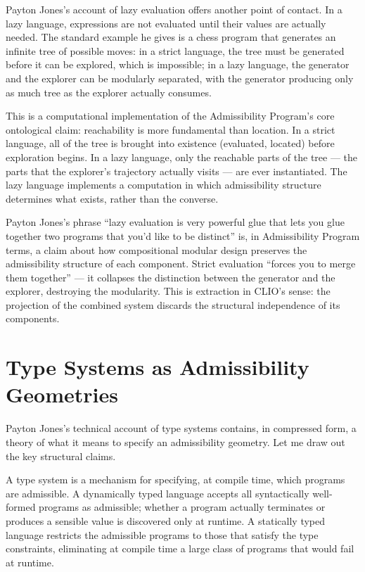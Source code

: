 \documentclass[12pt]{article}
\begin{document}
Payton Jones's account of lazy evaluation offers another point of contact. In a
lazy language, expressions are not evaluated until their values are actually
needed. The standard example he gives is a chess program that generates an
infinite tree of possible moves: in a strict language, the tree must be
generated before it can be explored, which is impossible; in a lazy language,
the generator and the explorer can be modularly separated, with the generator
producing only as much tree as the explorer actually consumes.

This is a computational implementation of the Admissibility Program's core
ontological claim: reachability is more fundamental than location. In a strict
language, all of the tree is brought into existence (evaluated, located) before
exploration begins. In a lazy language, only the reachable parts of the tree —
the parts that the explorer's trajectory actually visits — are ever instantiated.
The lazy language implements a computation in which admissibility structure
determines what exists, rather than the converse.

Payton Jones's phrase ``lazy evaluation is very powerful glue that lets you glue
together two programs that you'd like to be distinct'' is, in Admissibility
Program terms, a claim about how compositional modular design preserves the
admissibility structure of each component. Strict evaluation ``forces you to
merge them together'' — it collapses the distinction between the generator and
the explorer, destroying the modularity. This is extraction in CLIO's sense:
the projection of the combined system discards the structural independence of
its components.

\section{Type Systems as Admissibility Geometries}

Payton Jones's technical account of type systems contains, in compressed form,
a theory of what it means to specify an admissibility geometry. Let me draw out
the key structural claims.

A type system is a mechanism for specifying, at compile time, which programs are
admissible. A dynamically typed language accepts all syntactically well-formed
programs as admissible; whether a program actually terminates or produces a
sensible value is discovered only at runtime. A statically typed language
restricts the admissible programs to those that satisfy the type constraints,
eliminating at compile time a large class of programs that would fail at runtime.
\end{document}
